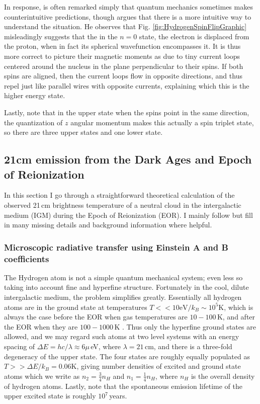 In response, is often remarked simply that quantum mechanics sometimes makes counterintuitive predictions, though \citet{griffiths82} argues that there is a more intuitive way to understand the situation. He observes that Fig. \ref{fig:HydrogenSpinFlipGraphic} misleadingly suggests that the in the $n=0$ state, the electron is displaced from the proton, when in fact its spherical wavefunction encompasses it. It is thus more correct to picture their magnetic moments as due to tiny current loops centered around the nucleus in the plane perpendicular to their spins. If both spins are aligned, then the current loops flow in opposite directions, and thus repel just like parallel wires with opposite currents, explaining which this is the higher energy state.

Lastly, note that in the upper state when the spins point in the same direction, the quantization of $z$ angular momentum makes this actually a spin triplet state, so there are three upper states and one lower state.

\subsection{21cm emission from the Dark Ages and Epoch of Reionization}

In this section I go through a straightforward theoretical calculation of the observed 21\,cm brightness temperature of a neutral cloud in the intergalactic medium (IGM) during the Epoch of Reionization (EOR). I  mainly follow \citet{PritchardLoebReview} but fill in many missing details and background information where helpful. 

\subsubsection{Microscopic radiative transfer using Einstein A and B coefficients}

The Hydrogen atom is not a simple quantum mechanical system; even less so taking into account fine and hyperfine structure. Fortunately in the cool, dilute intergalactic medium, the problem simplifies greatly. Essentially all hydrogen atoms are in the ground state at temperatures  $T<<10\text{eV}/k_B\sim10^5$K, which is always the case before the EOR when gas temperatures are $10-100$\,K, and after the EOR when they are $100-1000$\,K \citep{FurlanettoReview}. Thus only the hyperfine ground states are allowed, and we may regard such atoms at two level systems with an energy spacing of $\Delta E=hc/\lambda\approx6\mu$\,eV, where $\lambda=21$\,cm, and there is a three-fold degeneracy of the upper state. The four states are roughly equally populated as $T>>\Delta E/k_B =0.06$K, giving number densities of excited and ground state atoms which we write as $n_2=\frac{3}{4}n_H$ and $n_1=\frac{1}{4}n_H$, where $n_H$ is the overall density of hydrogen atoms. Lastly, note that the spontaneous emission lifetime of the upper excited state is roughly $10^7$\,years.

